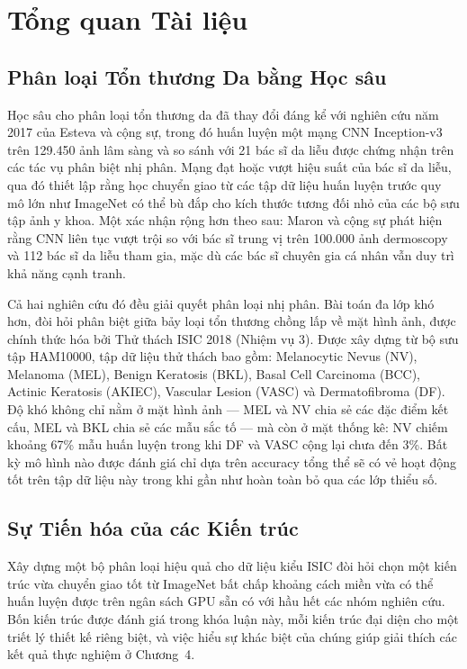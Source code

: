 \chapter{Tổng quan Tài liệu}

\section{Phân loại Tổn thương Da bằng Học sâu}

Học sâu cho phân loại tổn thương da đã thay đổi đáng kể với nghiên cứu năm 2017 của Esteva và cộng sự, trong đó huấn luyện một mạng CNN Inception-v3 trên 129.450 ảnh lâm sàng và so sánh với 21 bác sĩ da liễu được chứng nhận trên các tác vụ phân biệt nhị phân. Mạng đạt hoặc vượt hiệu suất của bác sĩ da liễu, qua đó thiết lập rằng học chuyển giao từ các tập dữ liệu huấn luyện trước quy mô lớn như ImageNet có thể bù đắp cho kích thước tương đối nhỏ của các bộ sưu tập ảnh y khoa. Một xác nhận rộng hơn theo sau: Maron và cộng sự phát hiện rằng CNN liên tục vượt trội so với bác sĩ trung vị trên 100.000 ảnh dermoscopy và 112 bác sĩ da liễu tham gia, mặc dù các bác sĩ chuyên gia cá nhân vẫn duy trì khả năng cạnh tranh.

Cả hai nghiên cứu đó đều giải quyết phân loại nhị phân. Bài toán đa lớp khó hơn, đòi hỏi phân biệt giữa bảy loại tổn thương chồng lấp về mặt hình ảnh, được chính thức hóa bởi Thử thách ISIC 2018 (Nhiệm vụ 3). Được xây dựng từ bộ sưu tập HAM10000, tập dữ liệu thử thách bao gồm: Melanocytic Nevus (NV), Melanoma (MEL), Benign Keratosis (BKL), Basal Cell Carcinoma (BCC), Actinic Keratosis (AKIEC), Vascular Lesion (VASC) và Dermatofibroma (DF). Độ khó không chỉ nằm ở mặt hình ảnh --- MEL và NV chia sẻ các đặc điểm kết cấu, MEL và BKL chia sẻ các mẫu sắc tố --- mà còn ở mặt thống kê: NV chiếm khoảng 67\% mẫu huấn luyện trong khi DF và VASC cộng lại chưa đến 3\%. Bất kỳ mô hình nào được đánh giá chỉ dựa trên accuracy tổng thể sẽ có vẻ hoạt động tốt trên tập dữ liệu này trong khi gần như hoàn toàn bỏ qua các lớp thiểu số.

\section{Sự Tiến hóa của các Kiến trúc}

Xây dựng một bộ phân loại hiệu quả cho dữ liệu kiểu ISIC đòi hỏi chọn một kiến trúc vừa chuyển giao tốt từ ImageNet bất chấp khoảng cách miền vừa có thể huấn luyện được trên ngân sách GPU sẵn có với hầu hết các nhóm nghiên cứu. Bốn kiến trúc được đánh giá trong khóa luận này, mỗi kiến trúc đại diện cho một triết lý thiết kế riêng biệt, và việc hiểu sự khác biệt của chúng giúp giải thích các kết quả thực nghiệm ở Chương~4.

